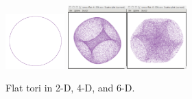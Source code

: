 \documentclass[a4paper]{report}
\begin{document}
\begin{article}
\begin{figure}[ht]
\centerline{\includegraphics[width=0.9in]{torus-flat-2.pdf} \includegraphics[width=0.9in]{torus-flat-4.pdf}\includegraphics[width=0.9in]{torus-flat-6.pdf}}
\caption{Flat tori in 2-D, 4-D, and 6-D.}
\label{flat1}
\end{figure}


\end{article}
\end{document}
